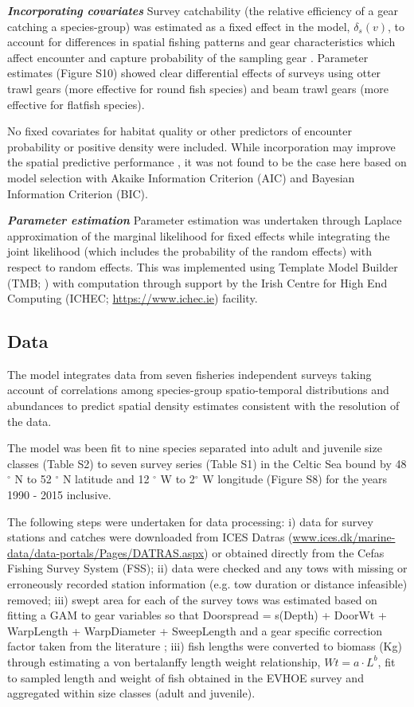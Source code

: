 \documentclass{nature}
\begin{document}
\textbf{\textit{Incorporating covariates}} Survey catchability (the relative
efficiency of a gear catching a species-group) was estimated as a fixed effect
in the model, $\delta_{s}(v)$, to account for differences in spatial fishing
patterns and gear characteristics which affect encounter and capture
probability of the sampling gear \cite{Thorson2014}. Parameter estimates
(Figure S10) showed clear differential effects of surveys using otter trawl
gears (more effective for round fish species) and beam trawl gears (more
effective for flatfish species).

No fixed covariates for habitat quality or other predictors of encounter
probability or positive density were included. While incorporation may improve
the spatial predictive performance \cite{Thorson2017}, it was not found to be
the case here based on model selection with Akaike Information Criterion (AIC)
and Bayesian Information Criterion (BIC).

\textbf{\textit{Parameter estimation}} Parameter estimation was undertaken
through Laplace approximation of the marginal likelihood for fixed effects
while integrating the joint likelihood (which includes the probability of the
random effects) with respect to random effects. This was implemented using
Template Model Builder (TMB; \cite{Kristensen2015}) with computation through
support by the Irish Centre for High End Computing (ICHEC;
\url{https://www.ichec.ie}) facility.  

\subsection{Data}

The model integrates data from seven fisheries independent surveys taking
account of correlations among species-group spatio-temporal distributions and
abundances to predict spatial density estimates consistent with the resolution
of the data. 

The model was been fit to nine species separated into adult and juvenile size
classes (Table S2) to seven survey series (Table S1) in the Celtic Sea bound by
48$^{\circ}$ N to 52 $^{\circ}$ N latitude and 12 $^{\circ}$ W to 2$^{\circ}$ W
longitude (Figure S8) for the years 1990 - 2015 inclusive. 

The following steps were undertaken for data processing: i) data for survey
stations and catches were downloaded from ICES Datras
(\url{www.ices.dk/marine-data/data-portals/Pages/DATRAS.aspx}) or obtained
directly from the Cefas Fishing Survey System (FSS); ii) data were checked and
any tows with missing or erroneously recorded station information (e.g. tow
duration or distance infeasible) removed; iii) swept area for each of the
survey tows was estimated based on fitting a GAM to gear variables so that
Doorspread = s(Depth) + DoorWt + WarpLength + WarpDiameter + SweepLength and a
gear specific correction factor taken from the literature \cite{Piet2009}; iii)
fish lengths were converted to biomass (Kg) through estimating a von
bertalanffy length weight relationship, $Wt = a \cdot L^{b}$, fit to sampled
length and weight of fish obtained in the EVHOE survey and aggregated within
size classes (adult and juvenile). 
\end{document}
